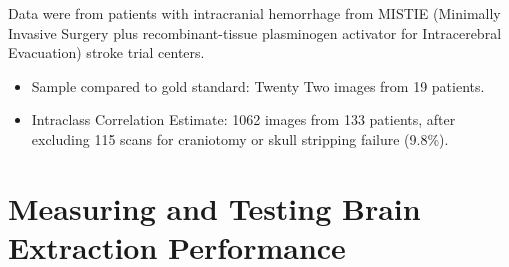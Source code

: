 \documentclass[final]{beamer}\usepackage[]{graphicx}\usepackage[]{color}
\begin{document}
\begin{frame}[fragile]
\begin{minipage}{0.39\linewidth}
\begin{multicols}{2}
Data were from patients with intracranial hemorrhage from MISTIE (Minimally Invasive Surgery plus recombinant-tissue plasminogen activator for Intracerebral Evacuation) stroke trial centers.
\begin{itemize}
\item Sample compared to gold standard: Twenty Two images from 19 patients. 
\item Intraclass Correlation Estimate: 1062 images from 133 patients, after excluding 115 scans for craniotomy or skull stripping failure (9.8\%).  
\end{itemize}
\end{multicols}
%



\section{Measuring and Testing Brain Extraction Performance}









\end{minipage}
\end{frame}
\end{document}
